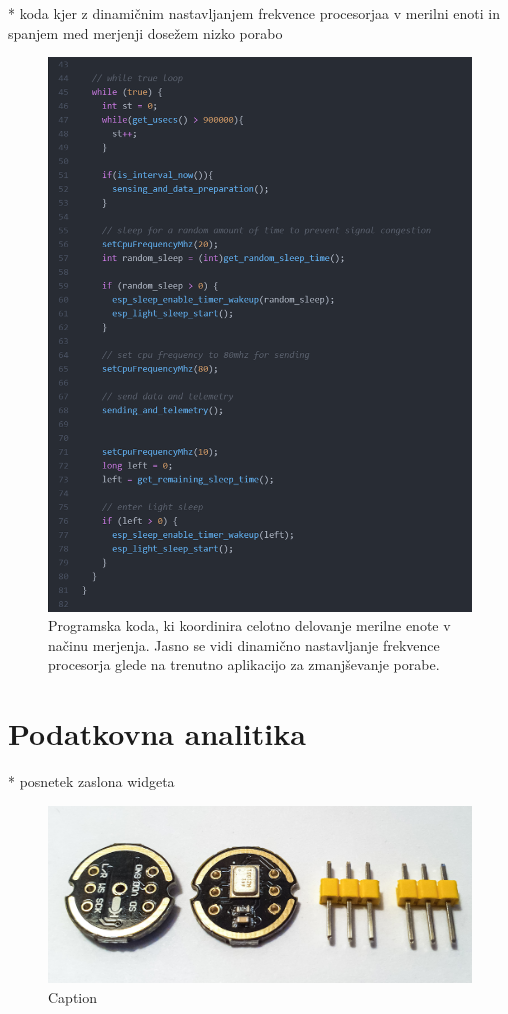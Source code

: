 \documentclass[a4paper, 12pt]{book}
\begin{document}
* koda kjer z dinamičnim nastavljanjem frekvence procesorjaa v merilni enoti in spanjem med merjenji dosežem nizko porabo
\begin{figure}[H]
    \centering
    \includegraphics[width=\linewidth]{slikovno_gradivo/koda_whille_loop.png}
    \caption{Programska koda, ki koordinira celotno delovanje merilne enote v načinu merjenja. Jasno se vidi dinamično nastavljanje frekvence procesorja glede na trenutno aplikacijo za zmanjševanje porabe.}
    \label{fig:koda_while_loop}
\end{figure}

\section{Podatkovna analitika}

* posnetek zaslona widgeta
\begin{figure}[H]
    \centering
    \includegraphics[width=\linewidth]{slikovno_gradivo/INMP441_1.jpg}
    \caption{Caption}
    \label{fig:INMP441}
\end{figure}
\end{document}
